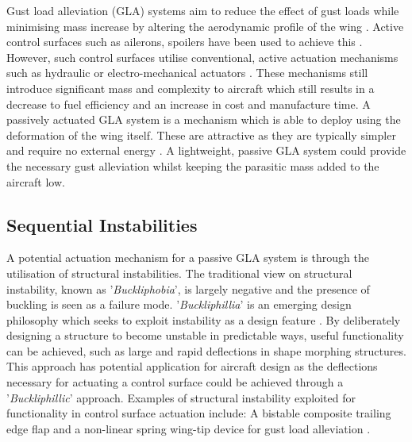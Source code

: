 \documentclass{IEEEtran}
\begin{document}
		Gust load alleviation (GLA) systems aim to reduce the effect of gust loads while minimising mass increase by altering the aerodynamic profile of the wing \cite{Li_2022}. Active control surfaces such as ailerons, spoilers have been used to achieve this \cite{Li_2022}. However, such control surfaces utilise conventional, active actuation mechanisms such as hydraulic or electro-mechanical actuators \cite{QI_2011}. These mechanisms still introduce significant mass and complexity to aircraft which still results in a decrease to fuel efficiency and an increase in cost and manufacture time. A passively actuated GLA system is a mechanism which is able to deploy using the deformation of the wing itself. These are attractive as they are typically simpler and require no external energy \cite{Li_2022}. A lightweight, passive GLA system could provide the necessary gust alleviation whilst keeping the parasitic mass added to the aircraft low.  
		
		\subsection{Sequential Instabilities}
		A potential actuation mechanism for a passive GLA system is through the utilisation of structural instabilities. The traditional view on structural instability, known as '\textit{Buckliphobia}', is largely negative and the presence of buckling is seen as a failure mode. '\textit{Buckliphillia}' is an emerging design philosophy which seeks to exploit instability as a design feature \cite{Reis_2015}. By deliberately designing a structure to become unstable in predictable ways, useful functionality can be achieved, such as large and rapid deflections in shape morphing structures. This approach has potential application for aircraft design as the deflections necessary for actuating a control surface could be achieved through a '\textit{Buckliphillic}' approach. Examples of structural instability exploited for functionality in control surface actuation include: A bistable composite trailing edge flap \cite{Daynes2010} and a non-linear spring wing-tip device for gust load alleviation \cite{Castrichini2017}.
\end{document}
